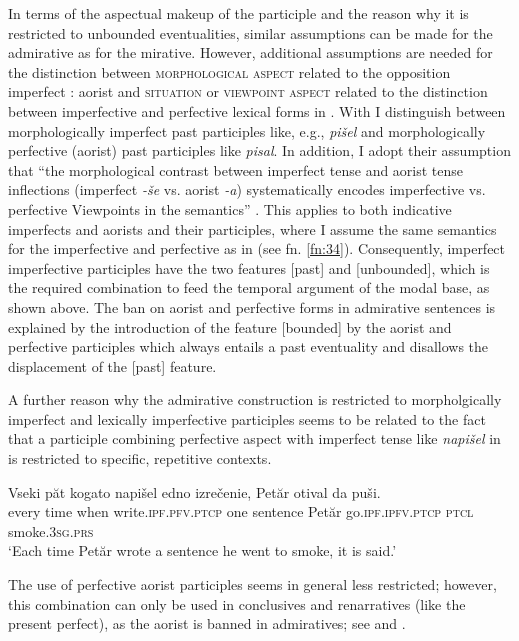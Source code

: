 \documentclass[output=paper,
colorlinks,
citecolor=brown,
newtxmath
]{langscibook}
\begin{document}
In terms of the aspectual makeup of the participle and the reason why it is restricted to unbounded eventualities, similar assumptions can be made for the  admirative as for the  mirative. However, additional assumptions are needed for the distinction between \textsc{morphological aspect} related to the opposition imperfect : aorist and \textsc{situation} or \textsc{viewpoint aspect} related to the distinction between imperfective and perfective lexical forms in . With \citet{Rivero.Slavkov2014} I distinguish between morphologically imperfect past participles like, e.g., \textit{pišel} and morphologically perfective (aorist) past participles like \textit{pisal}. In addition, I adopt their assumption that ``the morphological contrast between imperfect tense and aorist tense inflections (imperfect \textit{-še} vs. aorist \textit{-a}) systematically encodes imperfective vs. perfective Viewpoints in the semantics'' \citep[235]{Rivero.Slavkov2014}. This applies to both indicative imperfects and aorists and their participles, where I assume the same semantics for the imperfective and perfective as in \citeauthor{Bustamante2013} (see fn. \ref{fn:34}). Consequently,  imperfect imperfective participles have the two features [past] and [unbounded], which is the required combination to feed the temporal argument of the modal base, as shown above. The ban on aorist and perfective forms in admirative sentences is explained by the introduction of the feature [bounded] by the aorist and perfective participles which always entails a past eventuality and disallows the displacement of the [past] feature.

A further reason why the  admirative construction is restricted to morpholgically imperfect and lexically imperfective participles seems to be related to the fact that a participle combining perfective aspect with imperfect tense like \textit{napišel} in  is restricted to specific, repetitive contexts.

\ea\label{ex:napisel}
\gll Vseki păt kogato napišel edno izrečenie, Petăr otival da puši.\\
every time when write.\textsc{ipf.pfv.ptcp} one sentence Petăr go.\textsc{ipf.ipfv.ptcp} \textsc{ptcl} smoke.\textsc{3sg.prs}\\
\glt `Each time Petăr wrote a sentence he went to smoke, it is said.'
\z

\noindent The use of perfective aorist participles seems in general less restricted; however, this combination can only be used in conclusives and renarratives (like the present perfect), as the aorist is banned in admiratives; see  and .
\end{document}
